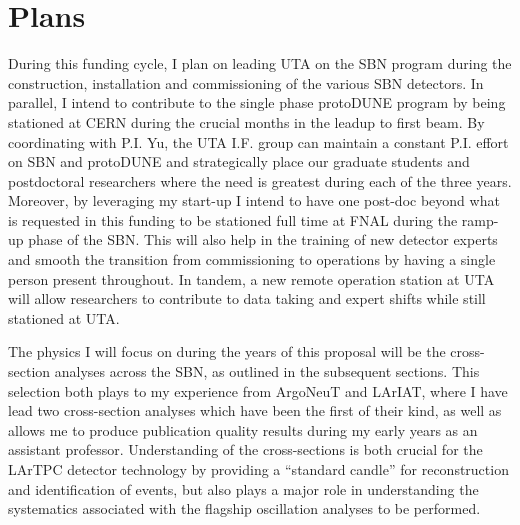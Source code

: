 \section*{\textbf{Plans}}
During this funding cycle, I plan on leading UTA on the SBN program during the construction, installation and commissioning of the various SBN detectors. In parallel, I intend to contribute to the single phase protoDUNE program by being stationed at CERN during the crucial months in the leadup to first beam. By coordinating with P.I. Yu, the UTA I.F. group can maintain a constant P.I. effort on SBN and protoDUNE and strategically place our graduate students and postdoctoral researchers where the need is greatest during each of the three years. Moreover, by leveraging my start-up I intend to have one post-doc beyond what is requested in this funding to be stationed full time at FNAL during the ramp-up phase of the SBN. This will also help in the training of new detector experts and smooth the transition from commissioning to operations by having a single person present throughout. In tandem, a new remote operation station at UTA will allow researchers to contribute to data taking and expert shifts while still stationed at UTA. 

The physics I will focus on during the years of this proposal will be the cross-section analyses across the SBN, as outlined in the subsequent sections. This selection both plays to my experience from ArgoNeuT and LArIAT, where I have lead two cross-section analyses which have been the first of their kind, as well as allows me to produce publication quality results during my early years as an assistant professor. Understanding of the cross-sections is both crucial for the LArTPC detector technology by providing a ``standard candle'' for reconstruction and identification of events, but also plays a major role in understanding the systematics associated with the flagship oscillation analyses to be performed.